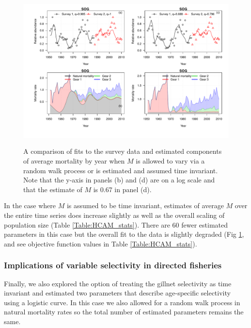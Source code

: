 \begin{figure}[!tbp]
	\includegraphics[width=\textwidth]{../FIGS/iscam_fig_HCAM_qFix_Mfix.pdf}\\
	\caption{A comparison of fits to the survey data and estimated components of average mortality by year when $M$ is allowed to vary via a random walk process or is estimated and assumed time invariant. Note that the y-axis in panels (b) and (d) are on a log scale and that the estimate of $M$ is 0.67 in panel (d). }\label{fig:qFix_Mfix}
\end{figure}
		
In the case where $M$ is assumed to be time invariant, estimates of average $M$ over the entire time series does increase slightly as well as the overall scaling of population size (Table \ref{Table:HCAM_stats}).  There are 60 fewer estimated parameters in this case but the overall fit to the data is slightly degraded (Fig \ref{fig:qFix_Mfix}, and see objective function values in Table \ref{Table:HCAM_stats}).
		
		\subsubsection{Implications of variable selectivity in directed fisheries}

Finally, we also explored the option of treating the gillnet selectivity as time invariant and estimated two parameters that describe age-specific selectivity using a logistic curve.	In this case we also allowed for a random walk  process in natural mortality rates so the total number of estimated parameters remains the same. 

